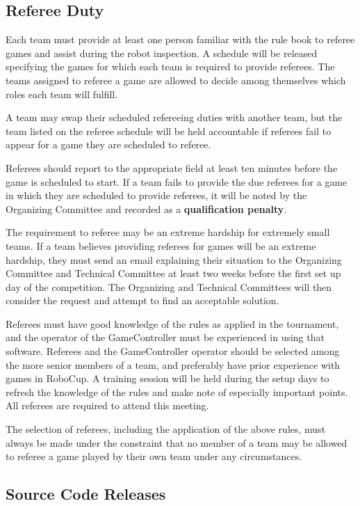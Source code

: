 \subsection{Referee Duty}
\label{sec:referee_duty}

Each team must provide at least one person familiar with the rule book to referee games and assist  during the robot inspection.
A schedule will be released specifying the games for which each team is required to provide referees.
The teams assigned to referee a game are allowed to decide among themselves which roles each team will fulfill.

A team may swap their scheduled refereeing duties with another team, but the team listed on the referee schedule will be held accountable if referees fail to appear for a game they are scheduled to referee.

Referees should report to the appropriate field at least ten minutes before the game is scheduled to start.
If a team fails to provide the due referees for a game in which they are scheduled to provide referees, it will be noted by the Organizing Committee and recorded as a \textbf{qualification penalty}.

The requirement to referee may be an extreme hardship for extremely small teams.
If a team believes providing referees for games will be an extreme hardship, they must send an email explaining their situation to the Organizing Committee and Technical Committee at least two weeks before the first set up day of the competition.
The Organizing and Technical Committees will then consider the request and attempt to find an acceptable solution.

Referees must have good knowledge of the rules as applied in the tournament, and the operator of the GameController must be experienced in using that software.
Referees and the GameController operator should be selected among the more senior members of a team, and preferably have prior experience with games in RoboCup.
A training session will be held during the setup days to refresh the knowledge of the rules and make note of especially important points. All referees are required to attend this meeting.

The selection of referees, including the application of the above rules,
must always be made under the constraint that no member of a team may be allowed to
referee a game played by their own team under any circumstances.

\subsection{Source Code Releases}
\label{sec:code_release}

